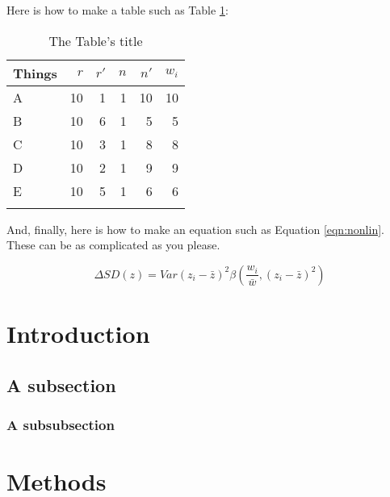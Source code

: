 \documentclass{article}[12pt]
\begin{document}
Here is how to make a table such as Table \ref{table:things table}:
\begin{table}[ht]
\begin{center}
\begin{tabular}{lrrrrr}%
\hline
Things&$r$&$r'$&$n$&$n'$&$w_i$\\
\hline
A&10&1&1&10&10 \\
B&10&6&1&5&5\\
C&10&3&1&8&8\\
D&10&2&1&9&9\\
E&10&5&1&6&6\\
\hline
\\
\end{tabular}
\caption{The Table's title}
\label{table:things table}
\end{center}
\end{table}

And, finally, here is how to make an equation such as Equation \ref{eqn:nonlin}. These can be as complicated as you please. 

\begin{equation}
\Delta SD(z)= Var(z_i-\bar z)^2\beta\left(\frac{w_i}{\bar w}, (z_i-\bar z)^2\right)
\label{eqn:nonlin}
\end{equation}



\clearpage

\section{Introduction}

\subsection{A subsection}

\subsubsection{A subsubsection}

\section{Methods}

\end{document}
